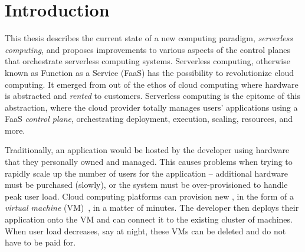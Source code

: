 \chapter{Introduction}
\label{chap:introduction}



This thesis describes the current state of a new computing paradigm, \emph{serverless computing}, and proposes improvements to various aspects of the control planes that orchestrate serverless computing systems.
Serverless computing, otherwise known as Function as a Service (FaaS) has the possibility to revolutionize cloud computing.
It emerged from out of the ethos of cloud computing where hardware is abstracted and \emph{rented} to customers.
Serverless computing is the epitome of this abstraction, where the cloud provider totally manages users' applications using a FaaS \emph{control plane}, orchestrating deployment, execution, scaling, resources, and more.

Traditionally, an application would be hosted by the developer using hardware that they personally owned and managed.
This causes problems when trying to rapidly scale up the number of users for the application -- additional hardware must be purchased (slowly), or the system must be over-provisioned to handle peak user load.
Cloud computing platforms can provision new , in the form of a \emph{virtual machine} (VM)~\cite{xen}, in a matter of minutes.
The developer then deploys their application onto the VM and can connect it to the existing cluster of machines.
When user load decreases, say at night, these VMs can be deleted and do not have to be paid for.

